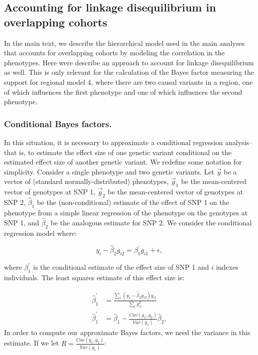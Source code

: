 \documentclass[11pt,titlepage]{article}
\begin{document}
\subsection{Accounting for linkage disequilibrium in overlapping cohorts}
In the main text, we describe the hierarchical model used in the main analyses that accounts for overlapping cohorts by modeling the correlation in the phenotypes. Here were describe an approach to account for linkage disequilibrium as well. This is only relevant for the calculation of the Bayes factor measuring the support for regional model 4, where there are two causal variants in a region, one of which influences the first phenotype and one of which influences the second phenotype.

\subsubsection{Conditional Bayes factors.} \label{conditional_bfs}
In this situation, it is necessary to approximate a conditional regression analysis--that is, to estimate the effect size of one genetic variant conditional on the estimated effect size of another genetic variant. We redefine some notation for simplicity. Consider a single phenotype and two genetic variants. Let $\vec y$ be a vector of (standard normally-distributed) phenotypes, $\vec g_{1}$ be the mean-centered vector of genotypes at SNP 1, $\vec g_{2}$ be the mean-centered vector of genotypes at SNP 2, $\hat \beta_1$ be the (non-conditional) estimate of the effect of SNP 1 on the phenotype from a simple linear regression of the phenotype on the genotypes at SNP 1, and $\hat \beta_2$ be the analogous estimate for SNP 2. We consider the conditional regression model where:

\begin{equation}
y_i - \hat \beta_2 g_{i2} =  \beta_1^{\prime} g_{i1} + \epsilon,
\end{equation}

\noindent where  $\beta_1^{\prime}$ is the conditional estimate of the effect size of SNP 1 and $i$ indexes individuals. The least squares estimate of this effect size is:

\begin{align}
\hat \beta_1^{\prime} &= \frac{\sum \limits_i (y_i - \hat \beta_2 g_{i2})  g_{i1}}{ \sum \limits_i g_{i1}^2} \\
\hat \beta_1^{\prime} &= \hat \beta_1 - \frac{Cov(g_1, g_2)}{Var(g_1)} \hat \beta_2,
\end{align}
\noindent In order to compute our approximate Bayes factors, we need the variance in this estimate. If we let $R = \frac{Cov(g_1, g_2)}{Var(g_1)}$:
\end{document}
